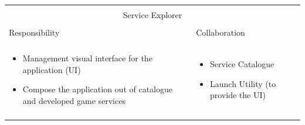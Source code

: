 \vspace{0.5cm} \noindent         
\begin{tabular}{|l|l|}
    \cline{1-2}
    \multicolumn{2}{|c|}{} \\[-0.3cm]
    \multicolumn{2}{|c|}{Service Explorer} \\ 
    \multicolumn{2}{|c|}{} \\[-0.3cm]
    \cline{1-2}
    Responsibility & Collaboration \\
    \cline{1-2}
    & \\[-0.2cm]
    \begin{minipage}{0.47\textwidth}
        \begin{itemize}
          \item Management visual interface for the application (UI)
          \item Compose the application out of catalogue and developed game
          services
        \end{itemize} 
    \end{minipage}
	&
    \begin{minipage}{0.47\textwidth}
        \begin{itemize}
          \item Service Catalogue
          \item Launch Utility (to provide the UI)
        \end{itemize} 
    \end{minipage}
	\\ & \\
    \hline
\end{tabular}

